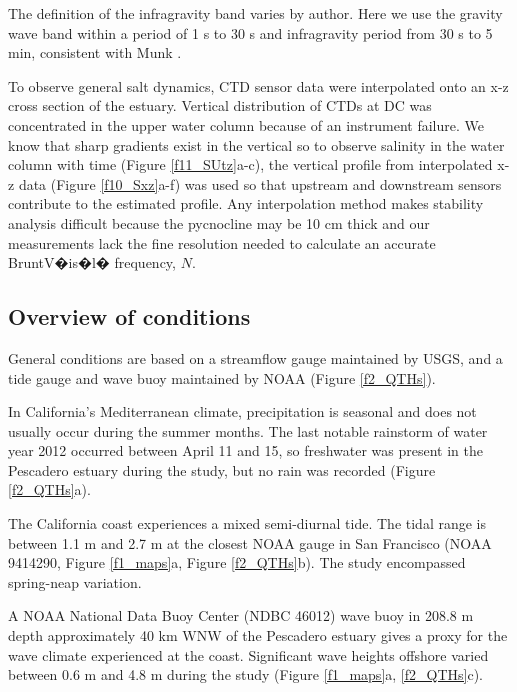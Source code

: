 The definition of the infragravity band varies by author. Here we
use the gravity wave band within a period of 1 s to 30 s and infragravity
period from 30 s to 5 min, consistent with Munk \citeyearpar{munk_1950}.

To observe general salt dynamics, CTD sensor data were interpolated
onto an x-z cross section of the estuary. Vertical distribution of
CTDs at DC was concentrated in the upper water column because of an
instrument failure. We know that sharp gradients exist in the vertical
so to observe salinity in the water column with time (Figure \ref{f11_SUtz}a-c),
the vertical profile from interpolated x-z data (Figure \ref{f10_Sxz}a-f)
was used so that upstream and downstream sensors contribute to the
estimated profile. Any interpolation method makes stability analysis
difficult because the pycnocline may be 10 cm thick and our measurements
lack the fine resolution needed to calculate an accurate Brunt\textendash V�is�l�
frequency, $N$.


\subsection{Overview of conditions\label{sub:ext_cond}}

General conditions are based on a streamflow gauge maintained by USGS,
and a tide gauge and wave buoy maintained by NOAA (Figure \ref{f2_QTHs}). 

In California's Mediterranean climate, precipitation is seasonal and
does not usually occur during the summer months. The last notable
rainstorm of water year 2012 occurred between April 11 and 15, so
freshwater was present in the Pescadero estuary during the study,
but no rain was recorded (Figure \ref{f2_QTHs}a). 

The California coast experiences a mixed semi-diurnal tide. The tidal
range is between 1.1 m and 2.7 m at the closest NOAA gauge in San
Francisco (NOAA 9414290, Figure \ref{f1_maps}a, Figure \ref{f2_QTHs}b).
The study encompassed spring-neap variation.

A NOAA National Data Buoy Center (NDBC 46012)\emph{ }wave buoy in
208.8 m depth approximately 40 km WNW of the Pescadero estuary gives
a proxy for the wave climate experienced at the coast. Significant
wave heights offshore varied between 0.6 m and 4.8 m during the study
(Figure \ref{f1_maps}a, \ref{f2_QTHs}c). 





